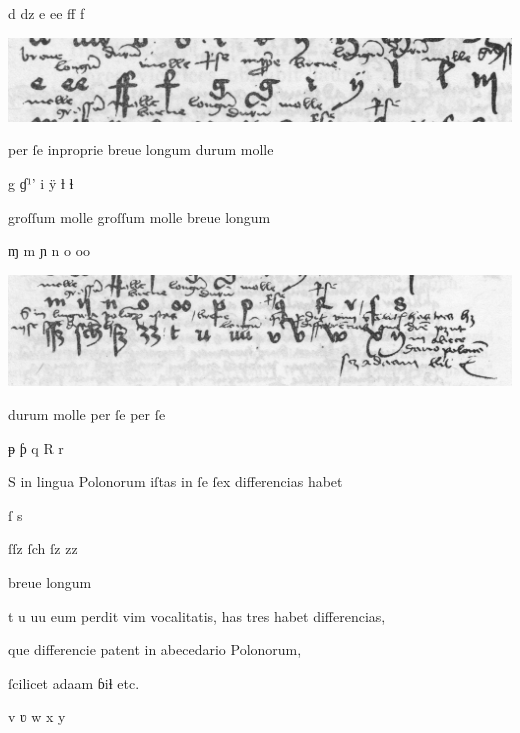 d dz e ee ff f

\includegraphics[width=\hsize]{wierszP27-28}

per ſe inproprie breue longum durum molle

g ɠ¹' i ÿ ƚ ɬ

groſſum molle groſſum molle breue longum

ɱ m ɲ n o oo

\includegraphics[width=\hsize]{wierszP29-koniec}

durum molle per ſe per ſe

ᵽ ƥ q R r

S in lingua Polonorum iſtas in ſe ſex differencias habet

ſ s 

ſſz ſch ſz zz

breue	longum


t u uu eum perdit vim vocalitatis, has tres habet differencias, 

que differencie patent in abecedario Polonorum, 

ſcilicet adaam ɓiɬ etc.

v ʋ w	x y


\endinput





















